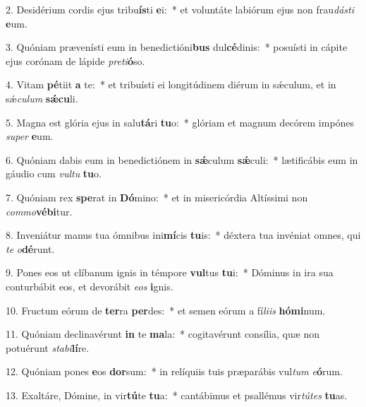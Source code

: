 2. Desidérium cordis ejus tribu\textbf{ís}ti \textbf{e}i:~*  et voluntáte labiórum ejus non frau\textit{dás}\textit{ti} \textbf{e}um.\

3. Quóniam prævenísti eum in benedictióni\textbf{bus} dul\textbf{cé}dinis:~*  posuísti in cápite ejus corónam de lápide \textit{pre}\textit{ti}\textbf{ó}so.\

4. Vitam \textbf{pé}tiit \textbf{a} te:~*  et tribuísti ei longitúdinem diérum in sǽculum, et in sǽ\textit{cu}\textit{lum} \textbf{sǽ}\textbf{cu}li.\

5. Magna est glória ejus in salu\textbf{tá}ri \textbf{tu}o:~*  glóriam et magnum decórem impónes \textit{su}\textit{per} \textbf{e}um.\

6. Quóniam dabis eum in benedictiónem in \textbf{sǽ}culum \textbf{sǽ}culi:~*  lætificábis eum in gáudio cum \textit{vul}\textit{tu} \textbf{tu}o.\

7. Quóniam rex \textbf{spe}rat in \textbf{Dó}mino:~*  et in misericórdia Altíssimi non \textit{com}\textit{mo}\textbf{vé}\textbf{bi}tur.\

8. Inveniátur manus tua ómnibus ini\textbf{mí}cis \textbf{tu}is:~*  déxtera tua invéniat omnes, qui \textit{te} \textit{o}\textbf{dé}runt.\

9. Pones eos ut clíbanum ignis in témpore \textbf{vul}tus \textbf{tu}i:~*  Dóminus in ira sua conturbábit eos, et devorábit \textit{e}\textit{os} \textbf{i}gnis.\

10. Fructum eórum de \textbf{ter}ra \textbf{per}des:~*  et semen eórum a fí\textit{li}\textit{is} \textbf{hó}\textbf{mi}num.\

11. Quóniam declinavérunt \textbf{in} te \textbf{ma}la:~*  cogitavérunt consília, quæ non potuérunt \textit{sta}\textit{bi}\textbf{lí}re.\

12. Quóniam pones \textbf{e}os \textbf{dor}sum:~*  in relíquiis tuis præparábis vul\textit{tum} \textit{e}\textbf{ó}rum.\

13. Exaltáre, Dómine, in vir\textbf{tú}te \textbf{tu}a:~*  cantábimus et psallémus vir\textit{tú}\textit{tes} \textbf{tu}as.\

